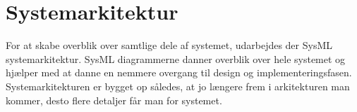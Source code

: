 \chapter{Systemarkitektur}


For at skabe overblik over samtlige dele af systemet, udarbejdes der SysML systemarkitektur. 
SysML diagrammerne danner overblik over hele systemet og hjælper med at danne en nemmere overgang til design og implementeringsfasen. 
Systemarkitekturen er bygget op således, at jo længere frem i arkitekturen man kommer, desto flere detaljer får man for systemet. 



\clearpage










